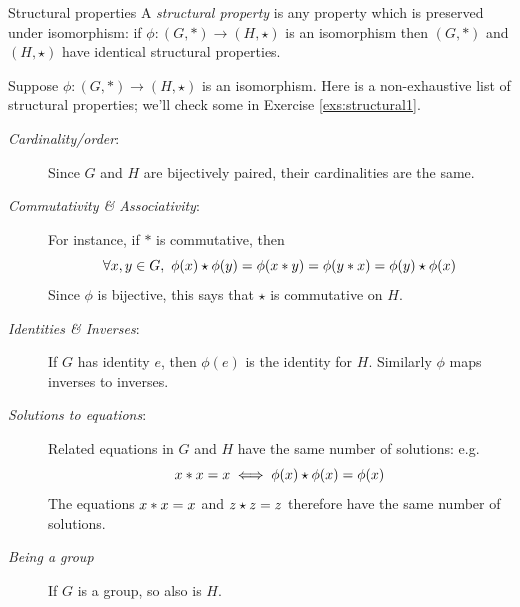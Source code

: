 	
\begin{defn}{Structural properties}{}
	A \emph{structural property} is any property which is preserved under isomorphism: if $\phi:(G,*)\to (H,\star)$ is an isomorphism then $(G,*)$ and $(H,\star)$ have identical structural properties.
\end{defn}


Suppose $\phi:(G,*)\to (H,\star)$ is an isomorphism. Here is a non-exhaustive list of structural properties; we'll check some in Exercise \ref{exs:structural1}.
\begin{description}
  \item[\normalfont\emph{Cardinality/order}:] Since $G$ and $H$ are bijectively paired, their cardinalities are the same.
  \item[\normalfont\emph{Commutativity \& Associativity}:] For instance, if $\ast$ is commutative, then
  \[
  	\forall x,y\in G,\ \phi(x)\opstar\phi(y)=\phi(x\opast y)=\phi(y\opast x)=\phi(y)\opstar\phi(x)
  \]
  Since $\phi$ is bijective, this says that $\star$ is commutative on $H$.
  \item[\normalfont\emph{Identities \& Inverses}:] If $G$ has identity $e$, then $\phi(e)$ is the identity for $H$. Similarly $\phi$ maps inverses to inverses.
  \item[\normalfont\emph{Solutions to equations}:] Related equations in $G$ and $H$ have the same number of solutions: e.g.
  \[x\mathbin{\ast} x=x\iff \phi(x)\mathbin{\star}\phi(x)=\phi(x)\]
  The equations $x\mathbin{\ast} x=x$ and $z\mathbin{\star} z=z$ therefore have the same number of solutions.%
  \item[\normalfont\emph{Being a group}] If $G$ is a group, so also is $H$.
\end{description}


\goodbreak

